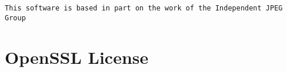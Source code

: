 \subsection{}\label{webots.jpeglicense.intro}%

\begin{lstlisting}[firstnumber=1,]
This software is based in part on the work of the Independent JPEG Group
\end{lstlisting}
\section{OpenSSL License}
\label{webots.openssllicense}%

\subsection{}\label{webots.openssllicense.intro}%

